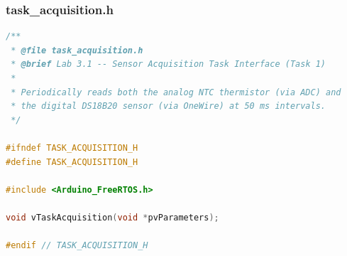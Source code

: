 \subsubsection{task\_acquisition.h}
\begin{lstlisting}[language=C++, caption=task\_acquisition.h --- Sensor Acquisition Task Interface]
/**
 * @file task_acquisition.h
 * @brief Lab 3.1 -- Sensor Acquisition Task Interface (Task 1)
 *
 * Periodically reads both the analog NTC thermistor (via ADC) and
 * the digital DS18B20 sensor (via OneWire) at 50 ms intervals.
 */

#ifndef TASK_ACQUISITION_H
#define TASK_ACQUISITION_H

#include <Arduino_FreeRTOS.h>

void vTaskAcquisition(void *pvParameters);

#endif // TASK_ACQUISITION_H
\end{lstlisting}

